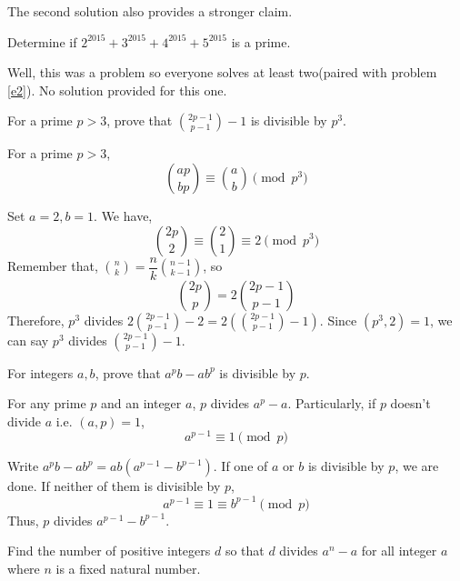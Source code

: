 \documentclass{subfile}
\begin{document}
		\begin{note}
			The second solution also provides a stronger claim.
		\end{note}
		
		\begin{problem}
			Determine if $2^{2015}+3^{2015}+4^{2015}+5^{2015}$ is a prime.
		\end{problem}
		
		\begin{solution}
			Well, this was a problem so everyone solves at least two(paired with problem \eqref{e2}). No solution provided for this one.
		\end{solution}
		
		\begin{problem}
			For a prime $p>3$, prove that $\binom{2p-1}{p-1}-1$ is divisible by $p^3$.
		\end{problem}
		
		\begin{solution}
			\begin{theorem}
				For a prime $p>3$, \[\binom{ap}{bp}\equiv\binom{a}{b}\pmod {p^3}\]
			\end{theorem}
			Set $a=2,b=1$. We have, \[\binom{2p}{2}\equiv\binom{2}{1}\equiv2\pmod {p^3}\]
			Remember that, $\binom{n}{k}=\dfrac{n}{k}\binom{n-1}{k-1}$, so \[\binom{2p}{p}=2\binom{2p-1}{p-1}\]
			Therefore, $p^3$ divides $2\binom{2p-1}{p-1}-2=2\left(\binom{2p-1}{p-1}-1\right)$. Since $(p^3,2)=1$, we can say $p^3$ divides $\binom{2p-1}{p-1}-1$.
		\end{solution}
		
		\begin{problem}\label{e2}
			For integers $a,b$, prove that $a^pb-ab^p$ is divisible by $p$.
		\end{problem}
		
		\begin{problem}
			\begin{theorem}
				For any prime $p$ and an integer $a$, $p$ divides $a^p-a$. Particularly, if $p$ doesn't divide $a$ i.e. $(a,p)=1$, 
				\[a^{p-1}\equiv1\pmod p\]
			\end{theorem}
			Write $a^pb-ab^p=ab(a^{p-1}-b^{p-1})$. If one of $a$ or $b$ is divisible by $p$, we are done. If neither of them is divisible by $p$,
			\[a^{p-1}\equiv1\equiv b^{p-1}\pmod p\]
			Thus, $p$ divides $a^{p-1}-b^{p-1}$.
		\end{problem}
		
		\begin{problem}
			Find the number of positive integers $d$ so that $d$ divides $a^n-a$ for all integer $a$ where $n$ is a fixed natural number.
		\end{problem}
		
\end{document}
